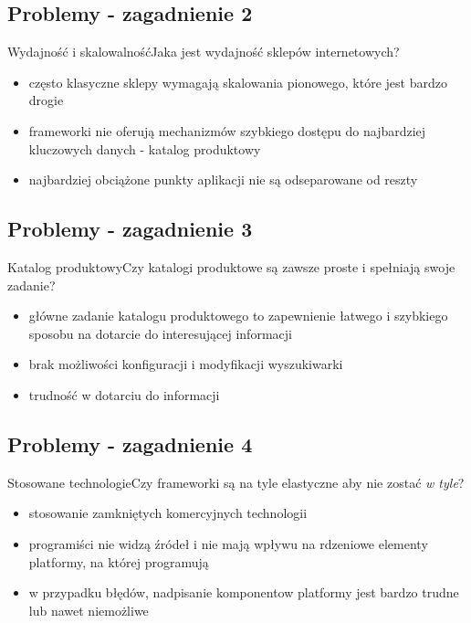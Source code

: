 \documentclass[polish,xcolor=table,9pt,aspectratio=1610,hyperref={pdfpagemode=FullScreen}]{beamer}
\begin{document}
\subsection{Problemy - zagadnienie 2}

\begin{frame}{Wydajność i skalowalność}{Jaka jest wydajność sklepów internetowych?}
	\begin{itemize}
		\item<1-> często klasyczne sklepy wymagają skalowania pionowego, które jest bardzo drogie
		\item<1-> frameworki nie oferują mechanizmów szybkiego dostępu do najbardziej kluczowych danych - katalog produktowy %
		\item<1-> najbardziej obciążone punkty aplikacji nie są odseparowane od reszty 
	\end{itemize}
\end{frame}

\subsection{Problemy - zagadnienie 3}

\begin{frame}{Katalog produktowy}{Czy katalogi produktowe są zawsze proste i spełniają swoje zadanie?}
	\begin{itemize}
		\item<1-> główne zadanie katalogu produktowego to zapewnienie łatwego i szybkiego sposobu na dotarcie do interesującej informacji
		\item<1-> brak możliwości konfiguracji i modyfikacji wyszukiwarki %
		\item<1-> trudność w dotarciu do informacji
	\end{itemize}
\end{frame}

\subsection{Problemy - zagadnienie 4}

\begin{frame}{Stosowane technologie}{Czy frameworki są na tyle elastyczne aby nie zostać \textit{w tyle}?}
	\begin{itemize}
		\item<1-> stosowanie zamkniętych komercyjnych technologii 
		\item<1-> programiści nie widzą źródeł i nie mają wpływu na rdzeniowe elementy platformy, na której programują 
		\item<1-> w przypadku błędów, nadpisanie komponentow platformy jest bardzo trudne lub nawet niemożliwe
	\end{itemize}
\end{frame}
\end{document}
